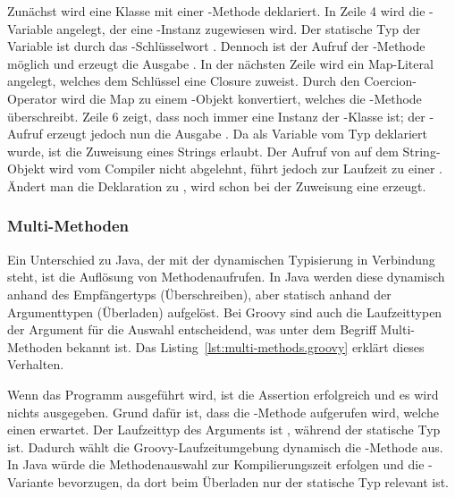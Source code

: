 
Zunächst wird eine Klasse  mit einer -Methode deklariert.
In Zeile 4 wird die -Variable angelegt, der eine -Instanz zugewiesen wird.
Der statische Typ der Variable ist durch das -Schlüsselwort .
Dennoch ist der Aufruf der -Methode möglich und erzeugt die Ausgabe .
In der nächsten Zeile wird ein Map-Literal angelegt, welches dem Schlüssel  eine Closure zuweist.
Durch den Coercion-Operator  wird die Map zu einem -Objekt konvertiert, welches die -Methode überschreibt.
Zeile 6 zeigt, dass  noch immer eine Instanz der -Klasse ist; der -Aufruf erzeugt jedoch nun die Ausgabe .
Da  als Variable vom Typ  deklariert wurde, ist die Zuweisung eines Strings erlaubt.
Der Aufruf von  auf dem String-Objekt wird vom Compiler nicht abgelehnt, führt jedoch zur Laufzeit zu einer .
Ändert man die Deklaration zu , wird schon bei der Zuweisung eine  erzeugt.

\subsubsection{Multi-Methoden}

Ein Unterschied zu Java, der mit der dynamischen Typisierung in Verbindung steht, ist die Auflösung von Methodenaufrufen.
In Java werden diese dynamisch anhand des Empfängertyps (Überschreiben), aber statisch anhand der Argumenttypen (Überladen) aufgelöst.
Bei Groovy sind auch die Laufzeittypen der Argument für die Auswahl entscheidend, was unter dem Begriff Multi-Methoden bekannt ist.
Das Listing~\ref{lst:multi-methods.groovy} erklärt dieses Verhalten.


Wenn das Programm ausgeführt wird, ist die Assertion erfolgreich und es wird nichts ausgegeben.
Grund dafür ist, dass die -Methode aufgerufen wird, welche einen  erwartet.
Der Laufzeittyp des Arguments  ist , während der statische Typ  ist.
Dadurch wählt die Groovy-Laufzeitumgebung dynamisch die -Methode aus.
In Java würde die Methodenauswahl zur Kompilierungszeit erfolgen und die -Variante bevorzugen, da dort beim Überladen nur der statische Typ relevant ist.

